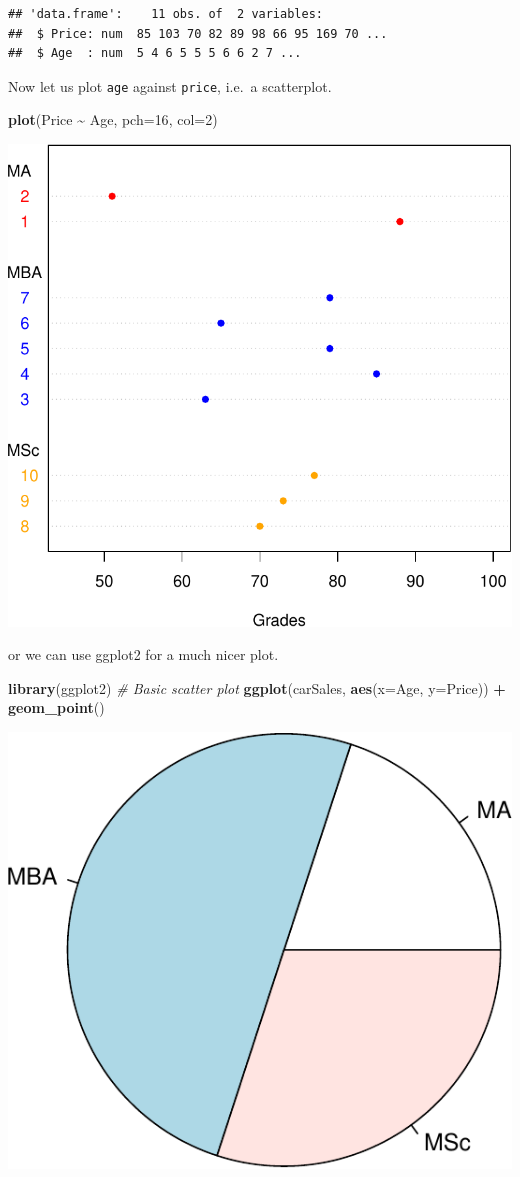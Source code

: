 \documentclass[
]{article}
\newenvironment{Shaded}{\begin{snugshade}}{\end{snugshade}}
\newcommand{\AttributeTok}[1]{\textcolor[rgb]{0.13,0.29,0.53}{#1}}
\newcommand{\CommentTok}[1]{\textcolor[rgb]{0.56,0.35,0.01}{\textit{#1}}}
\newcommand{\DecValTok}[1]{\textcolor[rgb]{0.00,0.00,0.81}{#1}}
\newcommand{\FunctionTok}[1]{\textcolor[rgb]{0.13,0.29,0.53}{\textbf{#1}}}
\newcommand{\NormalTok}[1]{#1}
\newcommand{\SpecialCharTok}[1]{\textcolor[rgb]{0.81,0.36,0.00}{\textbf{#1}}}
\begin{document}
\begin{verbatim}
## 'data.frame':    11 obs. of  2 variables:
##  $ Price: num  85 103 70 82 89 98 66 95 169 70 ...
##  $ Age  : num  5 4 6 5 5 5 6 6 2 7 ...
\end{verbatim}

Now let us plot \texttt{age} against \texttt{price}, i.e.~a scatterplot.

\begin{Shaded}
\begin{Highlighting}[]
\FunctionTok{plot}\NormalTok{(Price }\SpecialCharTok{\textasciitilde{}}\NormalTok{ Age, }\AttributeTok{pch=}\DecValTok{16}\NormalTok{, }\AttributeTok{col=}\DecValTok{2}\NormalTok{)}
\end{Highlighting}
\end{Shaded}

\begin{center}\includegraphics[width=0.5\linewidth,height=0.5\textheight]{unnamed-chunk-26-1} \end{center}

or we can use ggplot2 for a much nicer plot.

\begin{Shaded}
\begin{Highlighting}[]
\FunctionTok{library}\NormalTok{(ggplot2)}
\CommentTok{\# Basic scatter plot}
\FunctionTok{ggplot}\NormalTok{(carSales, }\FunctionTok{aes}\NormalTok{(}\AttributeTok{x=}\NormalTok{Age, }\AttributeTok{y=}\NormalTok{Price)) }\SpecialCharTok{+} \FunctionTok{geom\_point}\NormalTok{()}
\end{Highlighting}
\end{Shaded}

\begin{center}\includegraphics[width=0.5\linewidth,height=0.5\textheight]{unnamed-chunk-27-1} \end{center}
\end{document}
